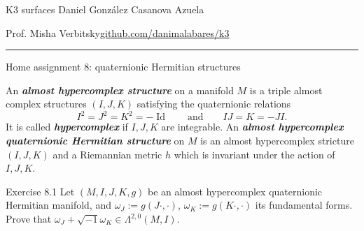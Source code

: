 

\usepackage[style=authortitle-terse,backend=bibtex]{biblatex}


\setcounter{secnumdepth}{2}



\begin{minipage}{\textwidth}
	\begin{minipage}{1\textwidth}
		K3 surfaces \hfill Daniel González Casanova Azuela
		
		{\small Prof. Misha Verbitsky\hfill\href{https://github.com/danimalabares/k3}{github.com/danimalabares/k3}}
	\end{minipage}
\end{minipage}\vspace{.2cm}\hrule

\vspace{10pt}
{\huge Home assignment 8: quaternionic Hermitian structures}

\begin{defn}\leavevmode
	An \textit{\textbf{almost hypercomplex structure}} on a manifold $M$ is a triple almost complex structures $(I,J,K)$ satisfying the quaternionic relations
	\[I^2=J^2=K^2=-\operatorname{Id}\qquad  \text{and} \qquad I J=K=-J I.\]
	It is called \textit{\textbf{hypercomplex}} if $I,J,K$ are integrable. An \textit{\textbf{almost hypercomplex quaternionic Hermitian structure}} on $M$ is an almost hypercomplex stricture $(I,J,K)$ and a Riemannian metric $h$ which is invariant under the action of $I,J,K$.
\end{defn}

\begin{thing4}{Exercise 8.1}\leavevmode
	Let $(M,I,J,K,g)$ be an almost hypercomplex quaternionic Hermitian manifold, and $\omega_J:=g(J\cdot,\cdot)$, $\omega_K:=g(K\cdot,\cdot)$ its fundamental forms. Prove that $\omega_J+\sqrt{-1}\omega_K \in \Lambda^{2,0}(M,I)$.
\end{thing4}

